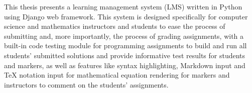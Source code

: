 
This thesis presents a learning management system (LMS) written in Python using
Django web framework. This system is designed specifically for computer science
and mathematics instructors and students to ease the process of submitting and,
more importantly, the process of grading assignments, with a built-in code
testing module for programming assignments to build and run all students'
submitted solutions and provide informative test results for students and
markers, as well as features like syntax highlighting, Markdown input and \TeX
notation input for mathematical equation rendering for markers and instructors
to comment on the students' assignments.



\afterpreface
